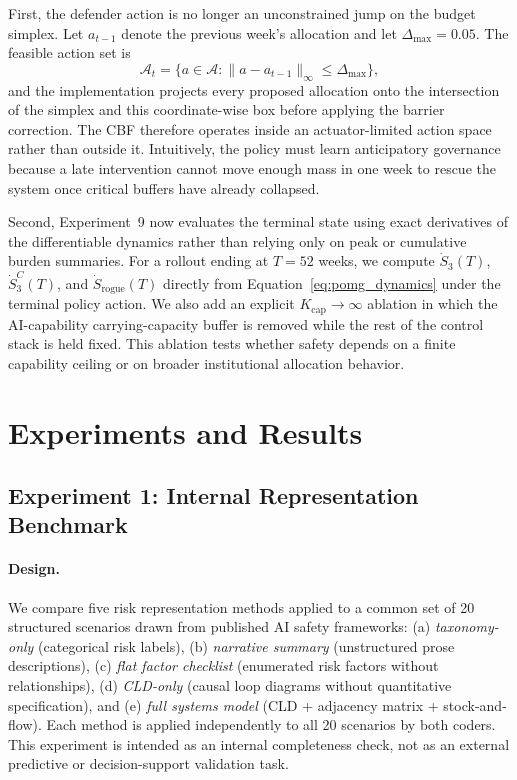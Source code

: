 \documentclass[11pt]{article}
\begin{document}
First, the defender action is no longer an unconstrained jump on the budget simplex. Let $a_{t-1}$ denote the previous week's allocation and let $\Delta_{\max} = 0.05$. The feasible action set is
\begin{equation}
\mathcal{A}_{t} = \{ a \in \mathcal{A} : \lVert a - a_{t-1} \rVert_{\infty} \le \Delta_{\max} \},
\label{eq:inertia}
\end{equation}
and the implementation projects every proposed allocation onto the intersection of the simplex and this coordinate-wise box before applying the barrier correction. The CBF therefore operates inside an actuator-limited action space rather than outside it. Intuitively, the policy must learn anticipatory governance because a late intervention cannot move enough mass in one week to rescue the system once critical buffers have already collapsed.

Second, Experiment~9 now evaluates the terminal state using exact derivatives of the differentiable dynamics rather than relying only on peak or cumulative burden summaries. For a rollout ending at $T = 52$ weeks, we compute $\dot{S}_3(T)$, $\dot{S}_3^C(T)$, and $\dot{S}_{\text{rogue}}(T)$ directly from Equation~\ref{eq:pomg_dynamics} under the terminal policy action. We also add an explicit $K_{\text{cap}} \to \infty$ ablation in which the AI-capability carrying-capacity buffer is removed while the rest of the control stack is held fixed. This ablation tests whether safety depends on a finite capability ceiling or on broader institutional allocation behavior.

\section{Experiments and Results}
\label{sec:experiments}

\subsection{Experiment 1: Internal Representation Benchmark}
\label{sec:exp1}

\paragraph{Design.} We compare five risk representation methods applied to a common set of 20 structured scenarios drawn from published AI safety frameworks: (a) \textit{taxonomy-only} (categorical risk labels), (b) \textit{narrative summary} (unstructured prose descriptions), (c) \textit{flat factor checklist} (enumerated risk factors without relationships), (d) \textit{CLD-only} (causal loop diagrams without quantitative specification), and (e) \textit{full systems model} (CLD + adjacency matrix + stock-and-flow). Each method is applied independently to all 20 scenarios by both coders. This experiment is intended as an internal completeness check, not as an external predictive or decision-support validation task.
\end{document}
